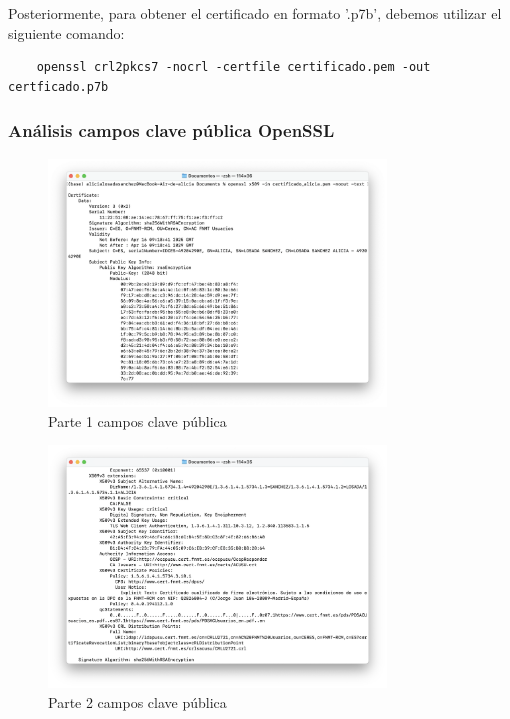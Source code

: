 Posteriormente, para obtener el certificado en formato '.p7b', debemos utilizar el siguiente comando:

\begin{verbatim}
    openssl crl2pkcs7 -nocrl -certfile certificado.pem -out certficado.p7b
\end{verbatim}

\subsubsection{Análisis campos clave pública OpenSSL}

\begin{figure}[H]
    \centering
    \includegraphics[width=0.8\textwidth]{apartadoc_1.png}
    \caption{Parte 1 campos clave pública}
    \label{fig:apartadoc_1}
\end{figure}

\begin{figure}[H]
    \centering
    \includegraphics[width=0.8\textwidth]{apartadoc_2.png}
    \caption{Parte 2 campos clave pública}
    \label{fig:apartadoc_2}
\end{figure}

